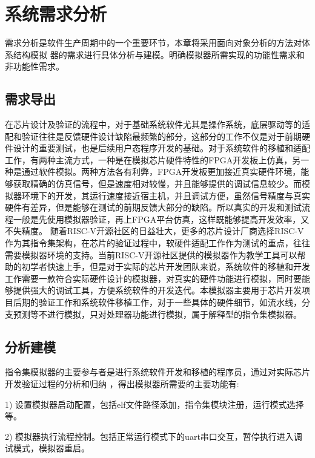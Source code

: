 
\chapter{系统需求分析}

需求分析是软件生产周期中的一个重要环节，本章将采用面向对象分析的方法对体系结构模拟
器的需求进行具体分析与建模。明确模拟器所需实现的功能性需求和非功能性需求。

\section{需求导出}

在芯片设计及验证的流程中，对于基础系统软件尤其是操作系统，底层驱动等的适配和验证往往是反馈硬件设计缺陷最频繁的部分，这部分的工作不仅是对于前期硬件设计的重要测试，也是后续用户态程序开发的基础。对于系统软件的移植和适配工作，有两种主流方式，一种是在模拟芯片硬件特性的FPGA开发板上仿真，另一种是通过软件模拟。两种方法各有利弊，FPGA开发板更加接近真实硬件环境，能够获取精确的仿真信号，但是速度相对较慢，并且能够提供的调试信息较少。而模拟器环境下的开发，其运行速度接近宿主机，并且调试方便，虽然信号精度与真实硬件有差异，但是能够在测试的前期反馈大部分的缺陷。所以真实的开发和测试流程一般是先使用模拟器验证，再上FPGA平台仿真，这样既能够提高开发效率，又不失精度。
随着RISC-V开源社区的日益壮大，更多的芯片设计厂商选择RISC-V作为其指令集架构，在芯片的验证过程中，软硬件适配工作作为测试的重点，往往需要模拟器环境的支持。当前RISC-V开源社区提供的模拟器作为教学工具可以帮助的初学者快速上手，但是对于实际的芯片开发团队来说，系统软件的移植和开发工作需要一款符合实际硬件设计的模拟器，对真实的硬件功能进行模拟，同时要能够提供强大的调试工具，方便系统软件的开发迭代。本模拟器主要用于芯片开发项目后期的验证工作和系统软件移植工作，对于一些具体的硬件细节，如流水线，分支预测等不进行模拟，只对处理器功能进行模拟，属于解释型的指令集模拟器。


\section{分析建模}

指令集模拟器的主要参与者是进行系统软件开发和移植的程序员，通过对实际芯片开发验证过程的分析和归纳
，得出模拟器所需要的主要功能有:


1) 设置模拟器启动配置，包括elf文件路径添加，指令集模块注册，运行模式选择等。


2) 模拟器执行流程控制。包括正常运行模式下的uart串口交互，暂停执行进入调试模式，模拟器重启。


